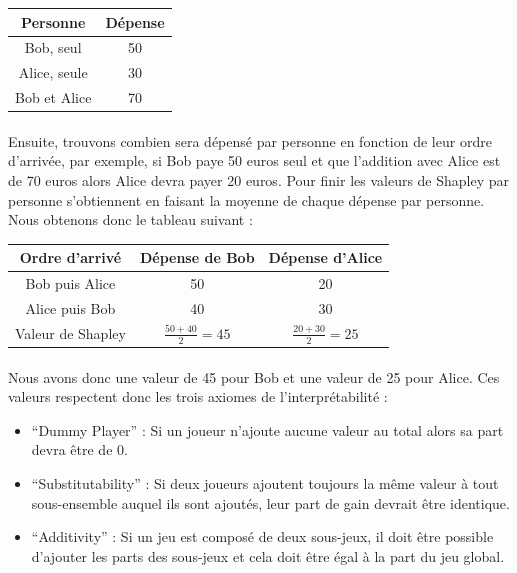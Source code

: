 \documentclass[10pt, french, a4paper]{report}
\begin{document}
\begin{center}
  \begin{tabular}{ |c|c| } 
   \hline
   Personne & Dépense \\ 
   \hline
   Bob, seul & 50 \\
   Alice, seule & 30 \\
   Bob et Alice & 70 \\
   \hline
  \end{tabular}
\end{center}

\paragraph{}
Ensuite, trouvons combien sera dépensé par personne en fonction de leur ordre d’arrivée, par exemple, si Bob paye 50 euros seul et que l’addition avec Alice est de 70 euros alors Alice devra payer 20 euros. Pour finir les valeurs de Shapley par personne s’obtiennent en faisant la moyenne de chaque dépense par personne. Nous obtenons donc le tableau suivant :


\begin{center}
  \begin{tabular}{ |c|c|c| } 
   \hline
   Ordre d’arrivé & Dépense de Bob & Dépense d’Alice \\ 
   \hline
   Bob puis Alice & 50 & 20 \\
   Alice puis Bob & 40 & 30 \\
   \hline
   Valeur de Shapley & $\frac{50+40}{2} = 45$ & $\frac{20+30}{2} = 25$ \\
   \hline
  \end{tabular}
\end{center}

\paragraph{}
Nous avons donc une valeur de 45 pour Bob et une valeur de 25 pour Alice. Ces valeurs respectent donc les trois axiomes de l’interprétabilité :
\begin{itemize}
  \item ``Dummy Player'' : Si un joueur n’ajoute aucune valeur au total alors sa part devra être de 0.
  \item ``Substitutability'' : Si deux joueurs ajoutent toujours la même valeur à tout sous-ensemble auquel ils sont ajoutés, leur part de gain devrait être identique.
  \item ``Additivity'' : Si un jeu est composé de deux sous-jeux, il doit être possible d’ajouter les parts des sous-jeux et cela doit être égal à la part du jeu global.
\end{itemize}
\end{document}
